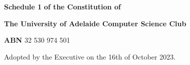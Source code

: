 \begin{titlepage}
    \begin{center}
 
        \vspace{1cm}
         \LARGE \textbf{Schedule 1}
         \Large \textbf{of the Constitution of}
        \vspace{0.3cm}
 
        \huge\textbf{The University of Adelaide Computer Science Club}
        
        \vspace{0.2cm}
        \Large\textbf{ABN} 32 530 974 501
        
        \vfill
        
        
 
        \vfill
             
             
      
         
        Adopted by the Executive on the 16th of October 2023.
        
             
    \end{center}
 \end{titlepage}